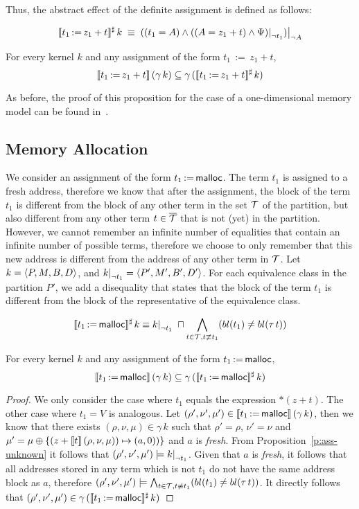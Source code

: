 Thus, the abstract effect of the definite assignment is defined as follows:

\[
	\sem{t_1\,{:=}\,z_1+t}^\sharp\,k\;\equiv\;
	\restr{((t_1=A)\land\restr{((A=z_1+t)\land\Psi)}{\neg t_1})}{\neg A}
\]

\begin{proposition}\label{p:ass-definite}
	For every kernel $k$ and any assignment of the form $t_1\,{:=}\,z_1+t$,
	\[
		\llbracket t_1\,{:=}\,z_1+t\rrbracket\,(\gamma\,k) \subseteq \gamma\,(\llbracket t_1\,{:=}\,z_1+t\rrbracket^\sharp\,k)
	\]
\end{proposition}

As before, the proof of this proposition for the case of a one-dimensional memory model can be found in~\cite{2pointer}.

\subsection{Memory Allocation}

We consider an assignment of the form $t_1\,{:=}\,\textsf{malloc}$.
The term $t_1$ is assigned to a fresh address, therefore we know that after the assignment,
the block of the term $t_1$ is different from the block of any other term in the set $\mathcal{T}$ of the partition,
but also different from any other term $t \in {\overline{\mathcal{T}}}$ that is not (yet) in the partition.
However, we cannot remember an infinite number of equalities that contain an infinite number of possible terms,
therefore we choose to only remember that this new address is different from the address of any other term in $\mathcal{T}$.
Let $k = \langle P, M, B,D\rangle$, and $\restr{k}{\neg t_1} = \angl{P', M', B', D'}$.
For each equivalence class in the partition $P'$, we add a disequality that states
that the block of the term $t_1$ is different from the block of the representative of the equivalence class.

\[
	\sem{t_1\,{:=}\,\text{\malloc}}^\sharp\,k \equiv
	\restr{k}{\neg t_1}\;\meet
	\bigwedge_{t\in \T, t \nequiv t_1}(bl(t_1) \neq bl(\tau\,t))
\]

\begin{proposition}\label{p:ass-malloc}
	For every kernel $k$ and any assignment of the form $t_1\,{:=}\,\textsf{malloc}$,
	\[
		\llbracket t_1\,{:=}\,\textsf{malloc}\rrbracket\,(\gamma\,k) \subseteq \gamma\,(\llbracket t_1\,{:=}\,\textsf{malloc}\rrbracket^\sharp\,k)
	\]
\end{proposition}

\begin{proof}
	We only consider the case where $t_1$ equals the expression $*(z+t)$.
	The other case where $t_1 = V$ is analogous.
	Let $(\rho',\nu',\mu') \in \llbracket t_1\,{:=}\,\textsf{malloc}\rrbracket\,(\gamma\,k)$, then we know that there exists $(\rho,\nu,\mu) \in \gamma\,k$ such that $\rho'=\rho$, $\nu'=\nu$ and $\mu' =\mu\oplus\{(z+\llbracket t\rrbracket\,(\rho,\nu,\mu))\mapsto (a,0))\}$ and $a$ is \emph{fresh}.
	From Proposition~\ref{p:ass-unknown} it follows that $(\rho',\nu',\mu') \models \restr{k}{\neg t_1}$.
	Given that $a$ is \emph{fresh}, it follows that all addresses stored in any term which is not $t_1$ do not have the same address block as $a$, therefore $(\rho',\nu',\mu') \models \bigwedge_{t\in \mathcal{T}, t \not\equiv t_1}(bl(t_1) \neq bl(\tau\,t))$.
	It directly follows that $(\rho',\nu',\mu') \in \gamma\,(\llbracket t_1\,{:=}\,\textsf{malloc}\rrbracket^\sharp\,k)$
\end{proof}
